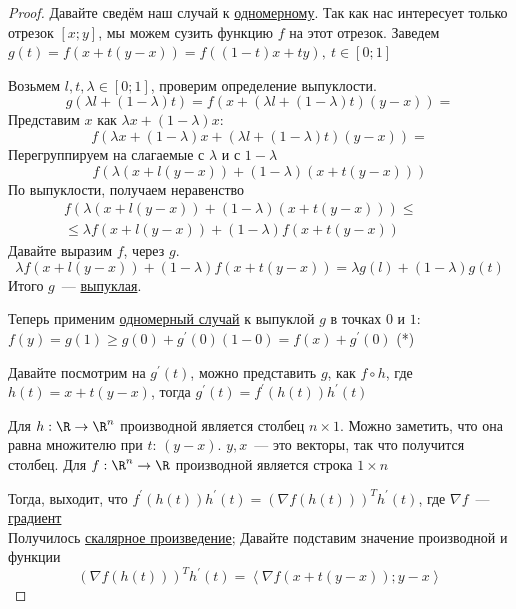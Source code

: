 \begin{proof}
  \proofpart{$\Rightarrow$}
  Давайте сведём наш случай к \hyperref[note:2F475EE4-2630-45FD-8DD2-8EA9D48059E4]{одномерному}.
  Так как нас интересует только отрезок $[x;y]$, мы можем сузить функцию $f$ на этот отрезок.
  Заведем $g(t) = f(x + t(y-x)) = f((1-t)x + ty),\ t \in [0;1]$

  Возьмем $l,t,\lambda \in [0;1]$, проверим определение выпуклости.
  \[
  g(\lambda l + (1-\lambda) t) = f(x + (\lambda l + (1-\lambda)t)(y-x)) =
  \]
  Представим $x$ как $\lambda x + (1-\lambda) x$:
  \[
  f(\lambda x + (1-\lambda) x + (\lambda l + (1-\lambda)t)(y-x)) =
  \]
  Перегруппируем на слагаемые с $\lambda$ и с $1-\lambda$
  \[
  f (\lambda ( x + l(y-x)) + (1-\lambda)(x + t(y-x)))
  \]
  По выпуклости, получаем неравенство
  \begin{multline*}
  f (\lambda ( x + l(y-x)) + (1-\lambda)(x + t(y-x))) \le \\
  \le \lambda f(x + l(y-x)) + (1-\lambda) f(x + t(y-x)) \qquad\qquad
  \end{multline*}
  Давайте выразим $f$, через $g$.
  \[
  \lambda f(x + l(y-x)) + (1-\lambda) f(x + t(y-x)) = \lambda g(l) + (1-\lambda) g(t)
  \]
  Итого $g$~--- \hyperref[note:1CA14F2C-637F-41DE-9E97-72075D19E97F]{выпуклая}.

  Теперь применим \hyperref[note:2F475EE4-2630-45FD-8DD2-8EA9D48059E4]{одномерный случай} к выпуклой $g$ в точках $0$ и $1$:
  $f(y)= g(1) \ge g(0) + g^{\prime}(0)(1-0) = f(x) + g^{\prime}(0)$ (*)

  Давайте посмотрим на $g^{\prime}(t)$, можно представить $g$, как $f \circ h$, где
  $h(t) = x + t(y-x)$, тогда $g^{\prime}(t) = f^{\prime}(h(t))h^{\prime}(t)$

  Для $h: \R \rightarrow \R^n$ производной является  столбец $n \times 1$. Можно заметить, что она равна множителю при $t$:  $(y-x)$.  $y,x$~--- это векторы, так что получится столбец.
  Для $f: \R^n \rightarrow \R$ производной является строка $1 \times n$

  Тогда, выходит, что $f^{\prime}(h(t)) h^{\prime}(t) = (\nabla f(h(t)))^T h^{\prime}(t)$, где $\nabla f$~--- \hyperref[note:1756907B-1FF2-4F62-8553-759B8509281C]{градиент} \\
  Получилось \hyperref[note:F2942E98-6115-4600-AA3F-E0F687D9C732]{скалярное произведение}; Давайте подставим значение производной и функции
  \[
  (\nabla f(h(t)))^T h^{\prime}(t) =\left\langle \nabla f(x + t(y-x)); y-x \right\rangle
  \]


\end{proof}
